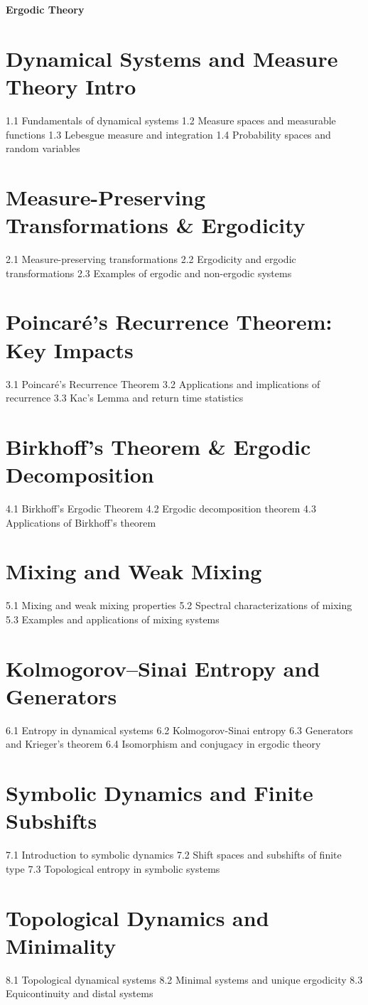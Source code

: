 {\LARGE \bf{Ergodic Theory}}
\section{Dynamical Systems and Measure Theory Intro}
1.1 Fundamentals of dynamical systems
1.2 Measure spaces and measurable functions
1.3 Lebesgue measure and integration
1.4 Probability spaces and random variables
\section{Measure-Preserving Transformations \& Ergodicity}
2.1 Measure-preserving transformations
2.2 Ergodicity and ergodic transformations
2.3 Examples of ergodic and non-ergodic systems
\section{Poincaré's Recurrence Theorem: Key Impacts}
3.1 Poincaré's Recurrence Theorem
3.2 Applications and implications of recurrence
3.3 Kac's Lemma and return time statistics
\section{Birkhoff's Theorem \& Ergodic Decomposition}
4.1 Birkhoff's Ergodic Theorem
4.2 Ergodic decomposition theorem
4.3 Applications of Birkhoff's theorem
\section{Mixing and Weak Mixing}
5.1 Mixing and weak mixing properties
5.2 Spectral characterizations of mixing
5.3 Examples and applications of mixing systems
\section{Kolmogorov–Sinai Entropy and Generators}
6.1 Entropy in dynamical systems
6.2 Kolmogorov-Sinai entropy
6.3 Generators and Krieger's theorem
6.4 Isomorphism and conjugacy in ergodic theory
\section{Symbolic Dynamics and Finite Subshifts}
7.1 Introduction to symbolic dynamics
7.2 Shift spaces and subshifts of finite type
7.3 Topological entropy in symbolic systems
\section{Topological Dynamics and Minimality}
8.1 Topological dynamical systems
8.2 Minimal systems and unique ergodicity
8.3 Equicontinuity and distal systems

